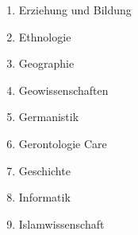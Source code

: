 \begin{enumerate}[noitemsep]
        \item Erziehung und Bildung                                                                                                                                                                                       \\
        \item Ethnologie                                                                                                                                                                                                  \\
        \item Geographie                                                                                                                                                                                                  \\
        \item Geowissenschaften                                                                                                                                                                                           \\
        \item Germanistik                                                                                                                                                                                                 \\
        \item Gerontologie  Care                                                                                                                                                                                          \\
        \item Geschichte                                                                                                                                                                                                  \\
        \item Informatik                                                                                                                                                                                                  \\
        \item Islamwissenschaft                                                                                                                                                                                           \\

\end{enumerate}
